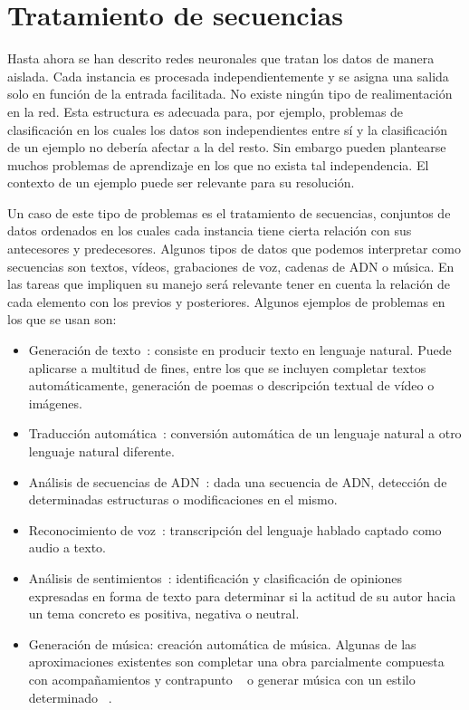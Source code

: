 
\chapter{Tratamiento de secuencias}

Hasta ahora se han descrito redes neuronales que tratan los datos de manera aislada. Cada instancia es procesada independientemente y se asigna una salida solo en función de la entrada facilitada. No existe ningún tipo de realimentación en la red. Esta estructura es adecuada para, por ejemplo, problemas de clasificación en los cuales los datos son independientes entre sí y la clasificación de un ejemplo no debería afectar a la del resto. Sin embargo pueden plantearse muchos problemas de aprendizaje en los que no exista tal independencia. El contexto de un ejemplo puede ser relevante para su resolución.

Un caso de este tipo de problemas es el tratamiento de secuencias, conjuntos de datos ordenados en los cuales cada instancia tiene cierta relación con sus antecesores y predecesores. Algunos tipos de datos que podemos interpretar como secuencias son textos, vídeos, grabaciones de voz, cadenas de ADN o música. En las tareas que impliquen su manejo será relevante tener en cuenta la relación de cada elemento con los previos y posteriores. Algunos ejemplos de problemas en los que se usan son:

\begin{itemize}
  \item Generación de texto~\cite{lu2018neural}: consiste en producir texto en lenguaje natural. Puede aplicarse a multitud de fines, entre los que se incluyen completar textos automáticamente, generación de poemas o descripción textual de vídeo o imágenes.
  \item Traducción automática~\cite{singh2017machine}: conversión automática de un lenguaje natural a otro lenguaje natural diferente.
  \item Análisis de secuencias de ADN~\cite{liu2019detection}: dada una secuencia de ADN, detección de determinadas estructuras o modificaciones en el mismo.
  \item Reconocimiento de voz~\cite{graves2013speech}: transcripción del lenguaje hablado captado como audio a texto.
  \item Análisis de sentimientos~\cite{valdivia2017sentiment}: identificación y clasificación de opiniones expresadas en forma de texto para determinar si la actitud de su autor hacia un tema concreto es positiva, negativa o neutral.
  \item Generación de música: creación automática de música. Algunas de las aproximaciones existentes son completar una obra parcialmente compuesta con acompañamientos y contrapunto ~\cite{huang2017counterpoint} o generar música con un estilo determinado ~\cite{carr2018generating}.
\end{itemize}

